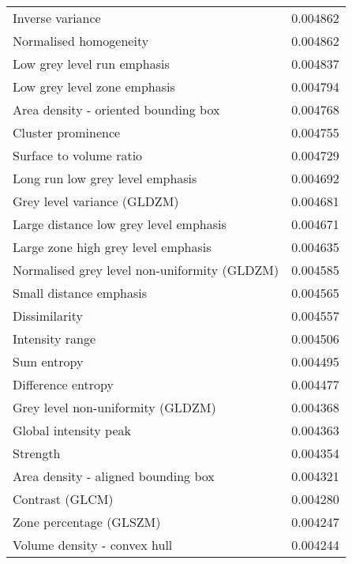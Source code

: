 \begin{longtable}{|lr|}
Inverse variance                                   &        0.004862 \\
Normalised homogeneity                             &        0.004862 \\
Low grey level run emphasis                        &        0.004837 \\
Low grey level zone emphasis                       &        0.004794 \\
Area density - oriented bounding box               &        0.004768 \\
Cluster prominence                                 &        0.004755 \\
Surface to volume ratio                            &        0.004729 \\
Long run low grey level emphasis                   &        0.004692 \\
Grey level variance (GLDZM)                        &        0.004681 \\
Large distance low grey level emphasis             &        0.004671 \\
Large zone high grey level emphasis                &        0.004635 \\
Normalised grey level non-uniformity (GLDZM)       &        0.004585 \\
Small distance emphasis                            &        0.004565 \\
Dissimilarity                                      &        0.004557 \\
Intensity range                                    &        0.004506 \\
Sum entropy                                        &        0.004495 \\
Difference entropy                                 &        0.004477 \\
Grey level non-uniformity (GLDZM)                  &        0.004368 \\
Global intensity peak                              &        0.004363 \\
Strength                                           &        0.004354 \\
Area density - aligned bounding box                &        0.004321 \\
Contrast (GLCM)                                    &        0.004280 \\
Zone percentage (GLSZM)                            &        0.004247 \\
Volume density - convex hull                       &        0.004244 \\

\end{longtable}
